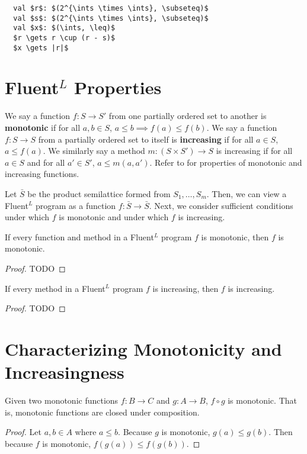 \documentclass{mwhittaker}
\newcommand{\fluentl}{Fluent$^L$}
\begin{document}
\begin{lstlisting}
  val $r$: $(2^{\ints \times \ints}, \subseteq)$
  val $s$: $(2^{\ints \times \ints}, \subseteq)$
  val $x$: $(\ints, \leq)$
  $r \gets r \cup (r - s)$
  $x \gets |r|$
\end{lstlisting}

\section{\fluentl{} Properties}
We say a function $f: S \to S'$ from one partially ordered set to another is
\textbf{monotonic} if for all $a, b \in S$, $a \leq b \implies f(a) \leq f(b)$.
We say a function $f: S \to S$ from a partially ordered set to itself is
\textbf{increasing} if for all $a \in S$, $a \leq f(a)$. We similarly say a
method $m: (S \times S') \to S$ is increasing if for all $a \in S$ and for all
$a' \in S'$, $a \leq m(a, a')$. Refer to  for properties of
monotonic and increasing functions.

Let $\bar{S}$ be the product semilattice formed from $S_1, \ldots, S_m$. Then,
we can view a \fluentl{} program as a function $f: \bar{S} \to \bar{S}$. Next,
we consider sufficient conditions under which $f$ is monotonic and under which
$f$ is increasing.

\begin{claim}
  If every function and method in a \fluentl{} program $f$ is monotonic, then
  $f$ is monotonic.
\end{claim}
\begin{proof}
  TODO
\end{proof}

\begin{claim}
  If every method in a \fluentl{} program $f$ is increasing, then $f$ is
  increasing.
\end{claim}
\begin{proof}
  TODO
\end{proof}

\appendix
\section{Characterizing Monotonicity and Increasingness}\label{sec:proofs}
\begin{claim}\label{clm:monotonic-closed}
  Given two monotonic functions $f: B \to C$ and $g: A \to B$, $f \circ g$ is
  monotonic. That is, monotonic functions are closed under composition.
\end{claim}
\begin{proof}
  Let $a, b \in A$ where $a \leq b$. Because $g$ is monotonic, $g(a) \leq
  g(b)$. Then because $f$ is monotonic, $f(g(a)) \leq f(g(b))$.
\end{proof}
\end{document}
